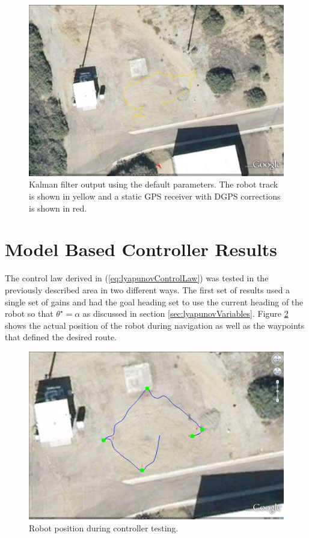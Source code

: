\begin{figure}[ht!]
	\centering
	\includegraphics[width=.95\textwidth]{images/kfPlainDataFirstAttempt}
	\caption{Kalman filter output using the default parameters. The robot track is shown in yellow and a static GPS receiver with DGPS corrections is shown in red.}
	\label{fig:kfPlainDataFirstAttempt}
\end{figure}

\section{Model Based Controller Results}
\label{sec:lyapunovResults}
The control law derived in (\ref{eq:lyapunovControlLaw}) was tested in the previously described area in two different ways. The first set of results used a single set of gains and had the goal heading set to use the current heading of the robot so that $\theta^\star=\alpha$ as discussed in section \ref{sec:lyapunovVariables}. Figure \ref{fig:resultsLyapunovGEKF} shows the actual position of the robot during navigation as well as the waypoints that defined the desired route.

\begin{figure}[ht!]
	\centering
	\includegraphics[width=.5\textwidth]{images/20100918_1717_GE_KF_waypts}
	\caption{Robot position during controller testing.}
	\label{fig:resultsLyapunovGEKF}
\end{figure}

